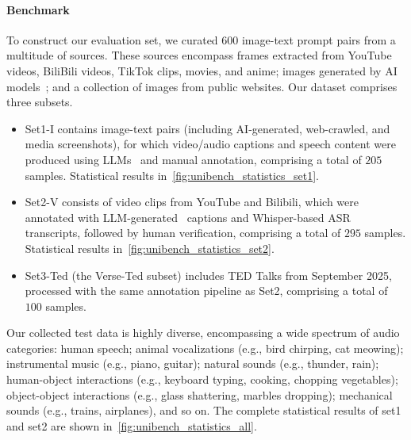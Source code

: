 \paragraph{Benchmark} To construct our evaluation set, we curated $600$ image-text prompt pairs from a multitude of sources. These sources encompass frames extracted from YouTube videos, BiliBili videos, TikTok clips, movies, and anime; images generated by AI models~\cite{jimeng,wu2025qwen}; and a collection of images from public websites. Our dataset comprises three subsets.
\begin{itemize}[leftmargin=*]
    \item Set1-I contains image-text pairs (including AI-generated, web-crawled, and media screenshots), for which video/audio captions and speech content were produced using LLMs~\cite{xu2025qwen2} and manual annotation, comprising a total of $205$ samples. Statistical results in~\ref{fig:unibench_statistics_set1}.
    \item Set2-V consists of video clips from YouTube and Bilibili, which were annotated with LLM-generated~\cite{xu2025qwen2} captions and Whisper-based ASR~\cite{radford2023robust} transcripts, followed by human verification, comprising a total of $295$ samples. Statistical results in~\ref{fig:unibench_statistics_set2}.
    \item Set3-Ted (the Verse-Ted subset) includes TED Talks from September 2025, processed with the same annotation pipeline as Set2, comprising a total of $100$ samples. 
\end{itemize}
Our collected test data is highly diverse, encompassing a wide spectrum of audio categories: human speech; animal vocalizations (e.g., bird chirping, cat meowing); instrumental music (e.g., piano, guitar); natural sounds (e.g., thunder, rain); human-object interactions (e.g., keyboard typing, cooking, chopping vegetables); object-object interactions (e.g., glass shattering, marbles dropping); mechanical sounds (e.g., trains, airplanes), and so on. The complete statistical results of set1 and set2 are shown in~\ref{fig:unibench_statistics_all}.

